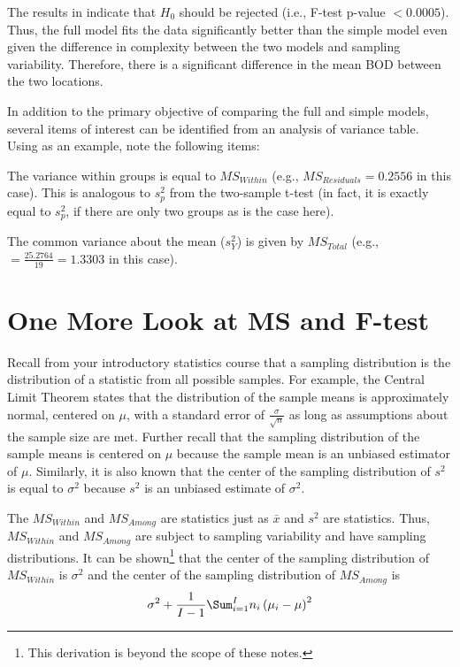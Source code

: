 \documentclass[10pt,openany]{book}\usepackage[]{graphicx}\usepackage[]{color}
\begin{document}
The results in  indicate that $H_{0}$ should be rejected (i.e., F-test p-value $<0.0005$).  Thus, the full model fits the data significantly better than the simple model even given the difference in complexity between the two models and sampling variability.  Therefore, there is a significant difference in the mean BOD between the two locations.

In addition to the primary objective of comparing the full and simple models, several items of interest can be identified from an analysis of variance table.  Using  as an example, note the following items:
\begin{Enumerate}
  \item The variance within groups is equal to $MS_{Within}$ (e.g., $MS_{Residuals}=0.2556$ in this case).  This is analogous to $s_{p}^{2}$ from the two-sample t-test (in fact, it is exactly equal to $s_{p}^{2}$, if there are only two groups as is the case here).
  \item The common variance about the mean ($s_{Y}^{2}$) is given by $MS_{Total}$ (e.g., $=\frac{25.2764}{19}=1.3303$ in this case).
\end{Enumerate}

\section{One More Look at MS and F-test}
Recall from your introductory statistics course that a sampling distribution is the distribution of a statistic from all possible samples.  For example, the Central Limit Theorem states that the distribution of the sample means is approximately normal, centered on $\mu$, with a standard error of $\frac{\sigma}{\sqrt{n}}$ as long as assumptions about the sample size are met.  Further recall that the sampling distribution of the sample means is centered on $\mu$ because the sample mean is an unbiased estimator of $\mu$.  Similarly, it is also known that the center of the sampling distribution of $s^{2}$ is equal to $\sigma^{2}$ because $s^{2}$ is an unbiased estimate of $\sigma^{2}$.

The $MS_{Within}$ and $MS_{Among}$ are statistics just as $\bar{x}$ and $s^{2}$ are statistics.  Thus, $MS_{Within}$ and $MS_{Among}$ are subject to sampling variability and have sampling distributions.  It can be shown\footnote{This derivation is beyond the scope of these notes.} that the center of the sampling distribution of $MS_{Within}$ is $\sigma^{2}$ and the center of the sampling distribution of $MS_{Among}$ is
\[ \sigma^{2} + \frac{1}{I-1}\Sum_{i=1}^{I}n_{i}\left(\mu_{i}-\mu\right)^{2} \]
\end{document}

